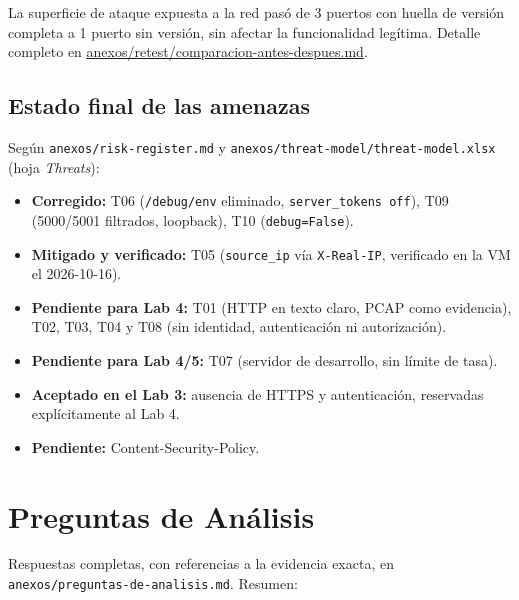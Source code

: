 \documentclass[journal]{IEEEtran}
\begin{document}
La superficie de ataque expuesta a la red pasó de 3 puertos con huella de
versión completa a 1 puerto sin versión, sin afectar la funcionalidad
legítima. Detalle completo en \url{anexos/retest/comparacion-antes-despues.md}.

\subsection{Estado final de las amenazas}

Según \texttt{anexos/risk-register.md} y \texttt{anexos/threat-model/threat-model.xlsx}
(hoja \textit{Threats}):

\begin{itemize}
    \item \textbf{Corregido:} T06 (\texttt{/debug/env} eliminado,
    \texttt{server\_tokens off}), T09 (5000/5001 filtrados, loopback), T10
    (\texttt{debug=False}).
    \item \textbf{Mitigado y verificado:} T05 (\texttt{source\_ip} vía
    \texttt{X-Real-IP}, verificado en la VM el 2026-10-16).
    \item \textbf{Pendiente para Lab 4:} T01 (HTTP en texto claro, PCAP como
    evidencia), T02, T03, T04 y T08 (sin identidad, autenticación ni
    autorización).
    \item \textbf{Pendiente para Lab 4/5:} T07 (servidor de desarrollo, sin
    límite de tasa).
    \item \textbf{Aceptado en el Lab 3:} ausencia de HTTPS y autenticación,
    reservadas explícitamente al Lab 4.
    \item \textbf{Pendiente:} Content-Security-Policy.
\end{itemize}

\section{Preguntas de Análisis}
\label{sec:preguntas}

Respuestas completas, con referencias a la evidencia exacta, en
\texttt{anexos/preguntas-de-analisis.md}. Resumen:
\end{document}
